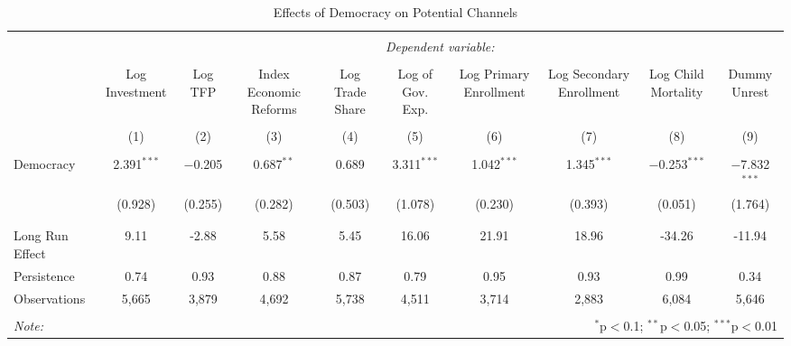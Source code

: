 
\begin{table}[!htbp] \centering 
  \caption{Effects of Democracy on Potential Channels} 
  \label{} 
\begin{tabular}{@{\extracolsep{5pt}}lccccccccc} 
\\[-1.8ex]\hline 
\hline \\[-1.8ex] 
 & \multicolumn{9}{c}{\textit{Dependent variable:}} \\ 
\cline{2-10} 
\\[-1.8ex] & Log Investment & Log TFP & Index Economic Reforms & Log Trade Share & Log of Gov. Exp. & Log Primary Enrollment & Log Secondary Enrollment & Log Child Mortality & Dummy Unrest \\ 
\\[-1.8ex] & (1) & (2) & (3) & (4) & (5) & (6) & (7) & (8) & (9)\\ 
\hline \\[-1.8ex] 
 Democracy & 2.391$^{***}$ & $-$0.205 & 0.687$^{**}$ & 0.689 & 3.311$^{***}$ & 1.042$^{***}$ & 1.345$^{***}$ & $-$0.253$^{***}$ & $-$7.832$^{***}$ \\ 
  & (0.928) & (0.255) & (0.282) & (0.503) & (1.078) & (0.230) & (0.393) & (0.051) & (1.764) \\ 
  & & & & & & & & & \\ 
\hline \\[-1.8ex] 
Long Run Effect & 9.11 & -2.88 & 5.58 & 5.45 & 16.06 & 21.91 & 18.96 & -34.26 & -11.94 \\ 
Persistence & 0.74 & 0.93 & 0.88 & 0.87 & 0.79 & 0.95 & 0.93 & 0.99 & 0.34 \\ 
Observations & 5,665 & 3,879 & 4,692 & 5,738 & 4,511 & 3,714 & 2,883 & 6,084 & 5,646 \\ 
\hline 
\hline \\[-1.8ex] 
\textit{Note:}  & \multicolumn{9}{r}{$^{*}$p$<$0.1; $^{**}$p$<$0.05; $^{***}$p$<$0.01} \\ 
\end{tabular} 
\end{table} 
